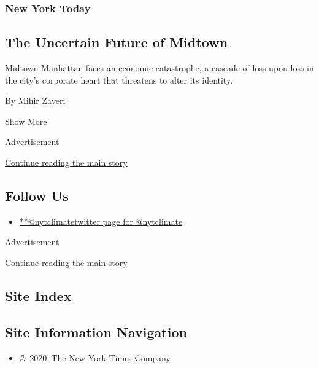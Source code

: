 \begin{enumerate}
  \hypertarget{new-york-today}{%
  \subsubsection{New York Today}\label{new-york-today}}

  \hypertarget{the-uncertain-future-of-midtown}{%
  \subsection{The Uncertain Future of
  Midtown}\label{the-uncertain-future-of-midtown}}

  Midtown Manhattan faces an economic catastrophe, a cascade of loss
  upon loss in the city's corporate heart that threatens to alter its
  identity.~

  By Mihir Zaveri
\end{enumerate}

Show More

Advertisement

\protect\hyperlink{after-mid2}{Continue reading the main story}

\hypertarget{follow-us}{%
\subsection{Follow Us}\label{follow-us}}

\begin{itemize}
\tightlist
\item
  \href{https://twitter.com/nytclimate}{**@nytclimatetwitter page for
  @nytclimate}
\end{itemize}

Advertisement

\protect\hyperlink{after-mktg}{Continue reading the main story}

\hypertarget{site-index}{%
\subsection{Site Index}\label{site-index}}

\hypertarget{site-information-navigation}{%
\subsection{Site Information
Navigation}\label{site-information-navigation}}

\begin{itemize}
\tightlist
\item
  \href{https://help.nytimes3xbfgragh.onion/hc/en-us/articles/115014792127-Copyright-notice}{©~2020~The
  New York Times Company}
\end{itemize}

